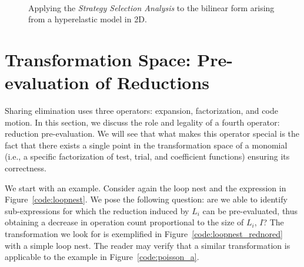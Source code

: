 \begin{figure}[htp]
\begin{CenteredBox}

\begin{subfigure}{0.55\textwidth}

\label{code:hyper_a}
\end{subfigure}
~~~~~~
\begin{subfigure}{0.65\textwidth}

\label{code:hyper_b}
\end{subfigure}

\end{CenteredBox}

\caption{Applying the {\em Strategy Selection Analysis} to the bilinear form arising from a hyperelastic model in 2D.}
\label{code:hyperelasticity}
\end{figure}

\clearpage

\section{Transformation Space: Pre-evaluation of Reductions}
\label{sec:pre-evaluation}
Sharing elimination uses three operators: expansion, factorization, and code motion. In this section, we discuss the role and legality of a fourth operator: reduction pre-evaluation. We will see that what makes this operator special is the fact that there exists a single point in the transformation space of a monomial (i.e., a specific factorization of test, trial, and coefficient functions) ensuring its correctness.

We start with an example. Consider again the loop nest and the expression in Figure~\ref{code:loopnest}. We pose the following question: are we able to identify sub-expressions for which the reduction induced by $L_i$ can be pre-evaluated, thus obtaining a decrease in operation count proportional to the size of $L_i$, $I$? The transformation we look for is exemplified in Figure~\ref{code:loopnest_rednored} with a simple loop nest. The reader may verify that a similar transformation is applicable to the example in Figure~\ref{code:poisson_a}.

